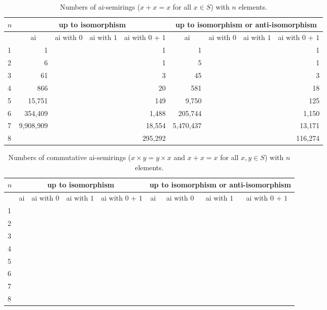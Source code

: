\documentclass{article}
\theoremstyle{definition}
\theoremstyle{plain}
\begin{document}
\begin{table}[ht]
  \centering
  \begin{tabular}{l|r|r|r|r|r|r|r|r}
    $n$
    & \multicolumn{4}{c|}{up to isomorphism}
    & \multicolumn{4}{c}{up to isomorphism or anti-isomorphism} \\
    \midrule
    & \multicolumn{1}{c|}{ai} & \multicolumn{1}{c|}{ai with $0$}
    & \multicolumn{1}{c|}{ai with $1$} & \multicolumn{1}{c|}{ai with $0$ + $1$}
    & \multicolumn{1}{c|}{ai} & \multicolumn{1}{c}{ai with $0$}
    & \multicolumn{1}{c|}{ai with $1$} & \multicolumn{1}{c|}{ai with $0$ + $1$}
    \\
    \midrule
    1 & 1             & &&1       & 1          & && 1      \\
    2 & 6             & &&1       & 5          & && 1      \\
    3 & 61            & &&3       & 45         & && 3      \\
    4 & 866           & &&20      & 581        & && 18     \\
    5 & 15,751        & &&149     & 9,750      & && 125    \\
    6 & 354,409       & &&1,488   & 205,744    & && 1,150  \\
    7 & 9,908,909     & &&18,554  & 5,470,437  & && 13,171 \\
    8 &               &           &&295,292 &  & && 116,274
  \end{tabular}
  \caption{Numbers of ai-semirings ($x + x = x$ for all $x\in S$) with $n$
  elements.}
  \label{tab:ai-semirings}
\end{table}

\begin{table}[ht]
  \centering
  \begin{tabular}{l|r|r|r|r|r|r|r|r}
    $n$
    & \multicolumn{4}{c|}{up to isomorphism}
    & \multicolumn{4}{c}{up to isomorphism or anti-isomorphism} \\
    \midrule
    & \multicolumn{1}{c|}{ai} & \multicolumn{1}{c|}{ai with $0$}
    & \multicolumn{1}{c|}{ai with $1$} & \multicolumn{1}{c|}{ai with $0$ + $1$}
    & \multicolumn{1}{c|}{ai} & \multicolumn{1}{c}{ai with $0$}
    & \multicolumn{1}{c|}{ai with $1$} & \multicolumn{1}{c|}{ai with $0$ + $1$}
    \\
    \midrule
    1 &              &          &&&          &       \\
    2 &              &          &&&          &       \\
    3 &             &         &&&          &       \\
    4 &            &        &&&         & \\
    5 &         &      &&&        & \\
    6 &        &    &&&      & \\
    7 &      &  &&&     & \\
    8 & & &&&    & \\
  \end{tabular}
  \caption{Numbers of commutative ai-semirings ($x\times y = y \times
    x$ and $x + x = x$ for all $x,y\in S$) with $n$
  elements.}
  \label{tab:ai-semirings}
\end{table}
\end{document}
